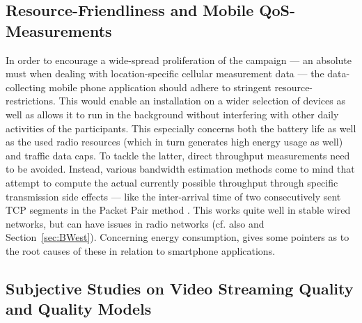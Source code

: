 \subsection{Resource-Friendliness and Mobile QoS-Measurements}

In order to encourage a wide-spread proliferation of the campaign --- an absolute must when dealing with location-specific cellular measurement data --- the data-collecting mobile phone application should adhere to stringent resource-restrictions. This would enable an installation on a wider selection of devices as well as allows it to run in the background without interfering with other daily activities of the participants. This especially concerns both the battery life as well as the used radio resources (which in turn generates high energy usage as well) and traffic data caps. To tackle the latter, direct throughput measurements need to be avoided. Instead, various bandwidth estimation methods come to mind that attempt to compute the actual currently possible throughput through specific transmission side effects --- like the inter-arrival time of two consecutively sent \acrshort{TCP} segments in the Packet Pair method \cite{Lai01nettimer:a,Ribeiro:2004:SAB:1005686.1005734,Strauss:2003:MSA:948205.948211}. This works quite well in stable wired networks, but can have issues in radio networks (cf. also \cite{6918916} and Section~\ref{sec:BWest}). Concerning energy consumption, \cite{schwartz13angryapps,6664206} gives some pointers as to the root causes of these in relation to smartphone applications.

\subsection{Subjective Studies on Video Streaming Quality and Quality Models}

